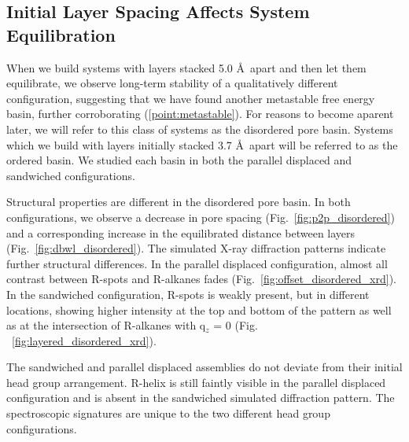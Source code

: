 \documentclass{article}
\newcommand{\angstrom}{\textup{\AA}}
\begin{document}
  \subsection{Initial Layer Spacing Affects System Equilibration}

  When we build systems with layers stacked 5.0 \AA~apart and then let them
  equilibrate, we observe long-term stability of a qualitatively different
  configuration, suggesting that we have found another metastable free energy
  basin, further corroborating (\ref{point:metastable}). For reasons to become
  aparent later, we will refer to this class of systems as the disordered pore
  basin.  Systems which we build with layers initially stacked 3.7 \AA~apart will
  be referred to as the ordered basin. We studied each basin in both the parallel
  displaced and sandwiched configurations. 

  Structural properties are different in the disordered pore basin.  In both
  configurations, we observe a decrease in pore spacing
  (Fig.~\ref{fig:p2p_disordered}) and a corresponding increase in the
  equilibrated distance between layers (Fig.~\ref{fig:dbwl_disordered}). The
  simulated X-ray diffraction patterns indicate further structural differences.
  In the parallel displaced configuration, almost all contrast between R-spots
  and R-alkanes fades (Fig.~\ref{fig:offset_disordered_xrd}). In the
  sandwiched configuration, R-spots is weakly present, but in different
  locations, showing higher intensity at the top and bottom of the pattern as
  well as at the intersection of R-alkanes with q$_z$ = 0 (Fig.
  ~\ref{fig:layered_disordered_xrd}). 

  The sandwiched and parallel displaced assemblies do not deviate from their
  initial head group arrangement. R-helix is still faintly visible in the
  parallel displaced configuration and is absent in the sandwiched simulated
  diffraction pattern. The spectroscopic signatures are unique to the two
  different head group configurations.
\end{document}
